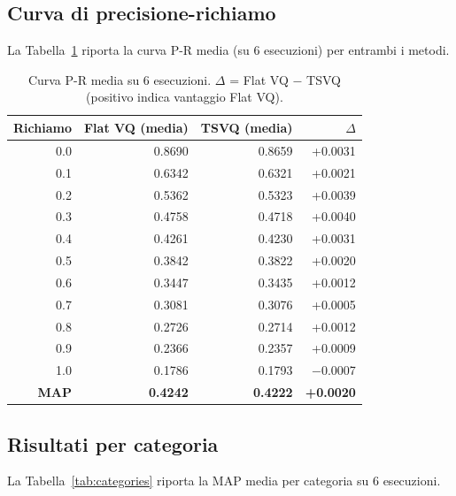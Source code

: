 \documentclass[12pt, a4paper]{article}
\begin{document}
\subsection{Curva di precisione-richiamo}

La Tabella~\ref{tab:pr} riporta la curva P-R media (su 6 esecuzioni) per entrambi i metodi.

\begin{table}[H]
\centering
\begin{tabular}{rrrr}
\toprule
\textbf{Richiamo} & \textbf{Flat VQ (media)} & \textbf{TSVQ (media)} & \textbf{$\Delta$} \\
\midrule
0.0 & 0.8690 & 0.8659 & +0.0031 \\
0.1 & 0.6342 & 0.6321 & +0.0021 \\
0.2 & 0.5362 & 0.5323 & +0.0039 \\
0.3 & 0.4758 & 0.4718 & +0.0040 \\
0.4 & 0.4261 & 0.4230 & +0.0031 \\
0.5 & 0.3842 & 0.3822 & +0.0020 \\
0.6 & 0.3447 & 0.3435 & +0.0012 \\
0.7 & 0.3081 & 0.3076 & +0.0005 \\
0.8 & 0.2726 & 0.2714 & +0.0012 \\
0.9 & 0.2366 & 0.2357 & +0.0009 \\
1.0 & 0.1786 & 0.1793 & $-$0.0007 \\
\midrule
\textbf{MAP} & \textbf{0.4242} & \textbf{0.4222} & \textbf{+0.0020} \\
\bottomrule
\end{tabular}
\caption{Curva P-R media su 6 esecuzioni. $\Delta$ = Flat VQ $-$ TSVQ (positivo indica
vantaggio Flat VQ).}
\label{tab:pr}
\end{table}

\subsection{Risultati per categoria}

La Tabella~\ref{tab:categories} riporta la MAP media per categoria su 6 esecuzioni.
\end{document}
